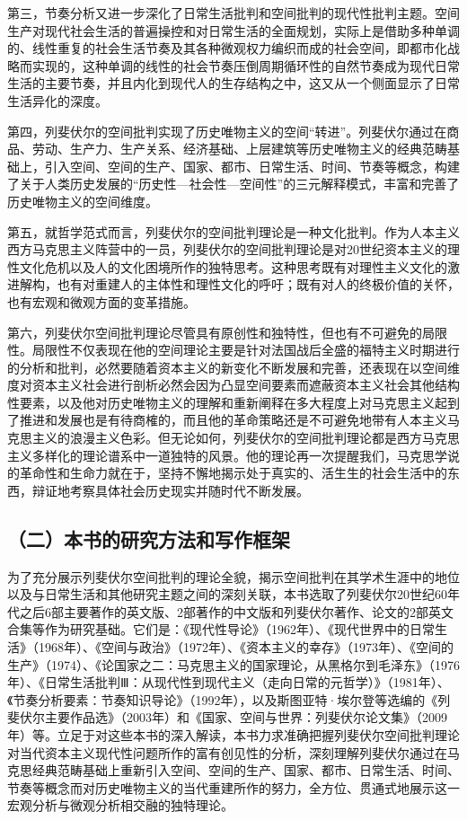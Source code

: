 \documentclass[UTF8, fontset = sourcesans, a4paper, oneside, zihao =
-4, scheme=chinese, no-math, space=true]{ctexbook}
\begin{document}
第三，节奏分析又进一步深化了日常生活批判和空间批判的现代性批判主题。空间生产对现代社会生活的普遍操控和对日常生活的全面规划，实际上是借助多种单调的、线性重复的社会生活节奏及其各种微观权力编织而成的社会空间，即都市化战略而实现的，这种单调的线性的社会节奏压倒周期循环性的自然节奏成为现代日常生活的主要节奏，并且内化到现代人的生存结构之中，这又从一个侧面显示了日常生活异化的深度。

第四，列斐伏尔的空间批判实现了历史唯物主义的空间``转进''。列斐伏尔通过在商品、劳动、生产力、生产关系、经济基础、上层建筑等历史唯物主义的经典范畴基础上，引入空间、空间的生产、国家、都市、日常生活、时间、节奏等概念，构建了关于人类历史发展的``历史性---社会性---空间性''的三元解释模式，丰富和完善了历史唯物主义的空间维度。

第五，就哲学范式而言，列斐伏尔的空间批判理论是一种文化批判。作为人本主义西方马克思主义阵营中的一员，列斐伏尔的空间批判理论是对20世纪资本主义的理性文化危机以及人的文化困境所作的独特思考。这种思考既有对理性主义文化的激进解构，也有对重建人的主体性和理性文化的呼吁；既有对人的终极价值的关怀，也有宏观和微观方面的变革措施。

第六，列斐伏尔空间批判理论尽管具有原创性和独特性，但也有不可避免的局限性。局限性不仅表现在他的空间理论主要是针对法国战后全盛的福特主义时期进行的分析和批判，必然要随着资本主义的新变化不断发展和完善，还表现在以空间维度对资本主义社会进行剖析必然会因为凸显空间要素而遮蔽资本主义社会其他结构性要素，以及他对历史唯物主义的理解和重新阐释在多大程度上对马克思主义起到了推进和发展也是有待商榷的，而且他的革命策略还是不可避免地带有人本主义马克思主义的浪漫主义色彩。但无论如何，列斐伏尔的空间批判理论都是西方马克思主义多样化的理论谱系中一道独特的风景。他的理论再一次提醒我们，马克思学说的革命性和生命力就在于，坚持不懈地揭示处于真实的、活生生的社会生活中的东西，辩证地考察具体社会历史现实并随时代不断发展。

\subsection{（二）本书的研究方法和写作框架}\label{part0004.htmlux5cux23d004}

为了充分展示列斐伏尔空间批判的理论全貌，揭示空间批判在其学术生涯中的地位以及与日常生活和其他研究主题之间的深刻关联，本书选取了列斐伏尔20世纪60年代之后6部主要著作的英文版、2部著作的中文版和列斐伏尔著作、论文的2部英文合集等作为研究基础。它们是：《现代性导论》（1962年）、《现代世界中的日常生活》（1968年）、《空间与政治》（1972年）、《资本主义的幸存》（1973年）、《空间的生产》（1974）、《论国家之二：马克思主义的国家理论，从黑格尔到毛泽东》（1976年）、《日常生活批判Ⅲ：从现代性到现代主义（走向日常的元哲学）》（1981年）、《节奏分析要素：节奏知识导论》（1992年），以及斯图亚特·埃尔登等选编的《列斐伏尔主要作品选》（2003年）和《国家、空间与世界：列斐伏尔论文集》（2009年）等。立足于对这些本书的深入解读，本书力求准确把握列斐伏尔空间批判理论对当代资本主义现代性问题所作的富有创见性的分析，深刻理解列斐伏尔通过在马克思经典范畴基础上重新引入空间、空间的生产、国家、都市、日常生活、时间、节奏等概念而对历史唯物主义的当代重建所作的努力，全方位、贯通式地展示这一宏观分析与微观分析相交融的独特理论。
\end{document}
